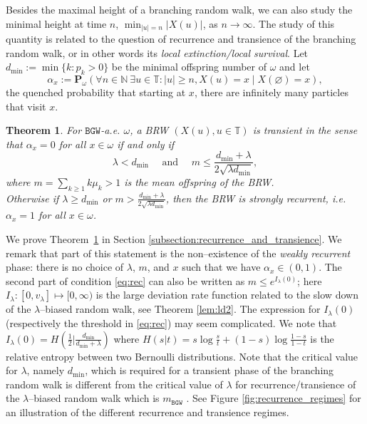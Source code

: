 \documentclass[11 pt]{article}
\newtheorem{theorem}{Theorem}[section]
\theoremstyle{definition}
\numberwithin{equation}{section}
\newcommand{\NN}{\mathbb{N}}
\newcommand{\TT}{\mathbb{T}} %
\newcommand{\Pw}{\mathbf{P}_{\omega}} %
\begin{document}
Besides the maximal height of a branching random walk, we can also study the minimal height at time $n$, $\min_{\vert u \vert =n} \vert X(u) \vert$, as $n \to \infty$. The study of this quantity is related to the question of recurrence and transience of the branching random walk, or in other words its {\it local extinction/local survival}. Let $d_{\min}:= \min\{k\colon p_k >0\}$ be the minimal offspring number of $\omega$ and let 
\[
\alpha_x:= \Pw \left( \forall n\in \NN \ \exists u\in \TT: \vert u \vert\geq n, X(u)=x \middle\vert  X(\varnothing) =x \right),
\]
the quenched probability that starting at $x$, there are infinitely many particles that visit $x$. 
 
 \begin{theorem} \label{thm:ls}
	For $\mathtt{BGW}$-a.e. $\omega$, a BRW $(X(u), u\in \TT)$ is transient in the sense that $\alpha_x = 0$ for all $x\in \omega$
	if and only if 
		\begin{equation}\label{eq:rec}
 \lambda < d_{\min} \quad \text{   and   }	\quad	m \leq 
			\frac{d_{\min}+\lambda}{2\sqrt{\lambda d_{\min}}},
	\end{equation}	
	where $ m= \sum_{k\ge 1} k \mu_k> 1$ is the  mean offspring of the BRW. \\
 	Otherwise if $\lambda \geq d_{\min}$ or $m>\frac{d_{\min}+\lambda}{2\sqrt{\lambda d_{\min}}}$,  then the BRW is strongly recurrent, i.e.\ $\alpha_x = 1$ for all $x\in \omega$.
 \end{theorem}
 
We prove Theorem~\ref{thm:ls} in Section \ref{subsection:recurrence_and_transience}. We remark that part of this statement is the non--existence of the \emph{weakly recurrent} phase: there is no choice of $\lambda$, $m$, and $x$ such that we have $\alpha_x \in (0,1)$. 
The second part of condition \eqref{eq:rec} can also be written as 
$m\le e^{I_{\lambda}(0)}$; here $I_\lambda:[0,v_\lambda] \mapsto [0,\infty)$ is the large deviation rate function related to the slow down of the $\lambda$--biased random walk, see Theorem \ref{lem:ld2}. The expression for $I_\lambda(0)$ (respectively the threshold in \eqref{eq:rec}) may seem complicated. We note that $I_\lambda(0) = H(\frac{1}{2} \vert \frac{d_{\min}}{d_{\min}+\lambda})$ where $H(s\vert t)= s\log \frac{s}{t} + (1-s)\log \frac{1-s}{1-t}$ is the relative entropy between two Bernoulli distributions. Note that the critical value for $\lambda$, namely $d_{\min}$, which is required for a transient phase of the branching random walk is different from the critical value of $\lambda$ for recurrence/transience of the $\lambda$--biased random walk which is $m_{\mathtt{BGW}}$ \cite[Proposition~6.4]{Lyo90}. See Figure \ref{fig:recurrence_regimes} for an illustration of the different recurrence and transience regimes.
	
\end{document}
